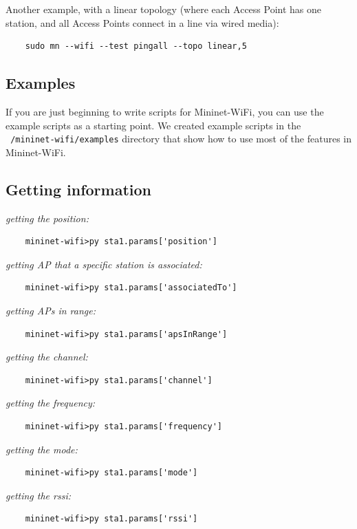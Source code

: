 \noindent Another example, with a linear topology (where each Access Point has one station, and all Access Points connect in a line via wired media):
\begin{verbatim}
    sudo mn --wifi --test pingall --topo linear,5
\end{verbatim}

\subsection{Examples}
If you are just beginning to write scripts for Mininet-WiFi, you can use the example scripts as a starting point. We created example scripts in the \texttt{~/mininet-wifi/examples} directory that show how to use most of the features in Mininet-WiFi.

\subsection{Getting information}

\noindent \textit{getting the position:}
\begin{verbatim}
    mininet-wifi>py sta1.params['position']
\end{verbatim}

\noindent \textit{getting AP that a specific station is associated:}
\begin{verbatim}
    mininet-wifi>py sta1.params['associatedTo']
\end{verbatim}

\noindent \textit{getting APs in range:}
\begin{verbatim}
    mininet-wifi>py sta1.params['apsInRange']
\end{verbatim}

\noindent \textit{getting the channel:}
\begin{verbatim}
    mininet-wifi>py sta1.params['channel']
\end{verbatim}

\noindent \textit{getting the frequency:}
\begin{verbatim}
    mininet-wifi>py sta1.params['frequency']
\end{verbatim}

\noindent \textit{getting the mode:}
\begin{verbatim}
    mininet-wifi>py sta1.params['mode']
\end{verbatim}

\noindent \textit{getting the rssi:}
\begin{verbatim}
    mininet-wifi>py sta1.params['rssi']
\end{verbatim}

